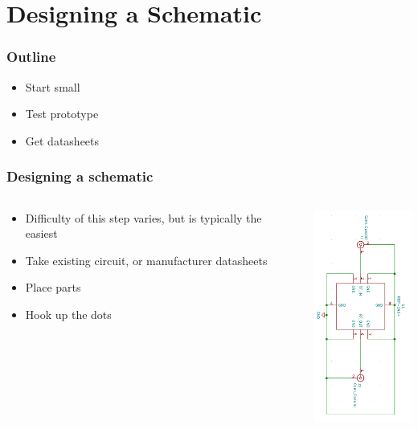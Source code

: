 \documentclass[]{beamer}
\begin{document}
\section[Design]{Designing a Schematic}
\begin{frame}
    \frametitle{\insertsection{} Outline}
    \begin{itemize}
        \item Start small
        \item Test prototype
        \item Get datasheets
    \end{itemize}
\end{frame}

\begin{frame}
    \frametitle{Designing a schematic}
    \begin{columns}[T]
        \begin{column}[T]{5cm}
            \begin{itemize}%
                \item{Difficulty of this step varies, but is
                    typically the easiest}
                \item{Take existing circuit, or manufacturer
                    datasheets}
                \item{Place parts}
                \item{Hook up the dots}
            \end{itemize}
        \end{column}
        \begin{column}[T]{5cm}
            \includegraphics[height=7cm]{images/eeschema.png}
        \end{column}
    \end{columns}
\end{frame}
\end{document}
